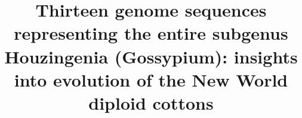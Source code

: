 \documentclass{bmcart}
\begin{document}
\begin{frontmatter}

\begin{fmbox}


\title{Thirteen genome sequences representing the entire subgenus Houzingenia (Gossypium): insights into evolution of the New World diploid cottons}

\author[
   addressref={aff1},                   %
   corref={aff1},                       %
   noteref={n1},                        %
   email={corrinne@iastate.edu}   %
]{ }
\author[
   addressref={aff2},
   email={maa146@igbb.msstate.edu}
]{ }
\author[
addressref={aff1},
email={jconover@iastate.edu}
]{ }
\author[
addressref={aff3},
email={Jodi.Scheffler@ARS.USDA.GOV}
]{ }
\author[
addressref={aff2},
email={william.s.sanders@gmail.com}
]{ }
\author[
addressref={aff2},
email={peterson@IGBB.msstate.edu}
]{ }
\author[
addressref={aff3},
email={Brian.Scheffler@ARS.USDA.GOV}
]{ }
\author[
addressref={aff1},
email={jfw@iastate.edu}
]{ }



\end{fmbox}
\end{frontmatter}
\end{document}
